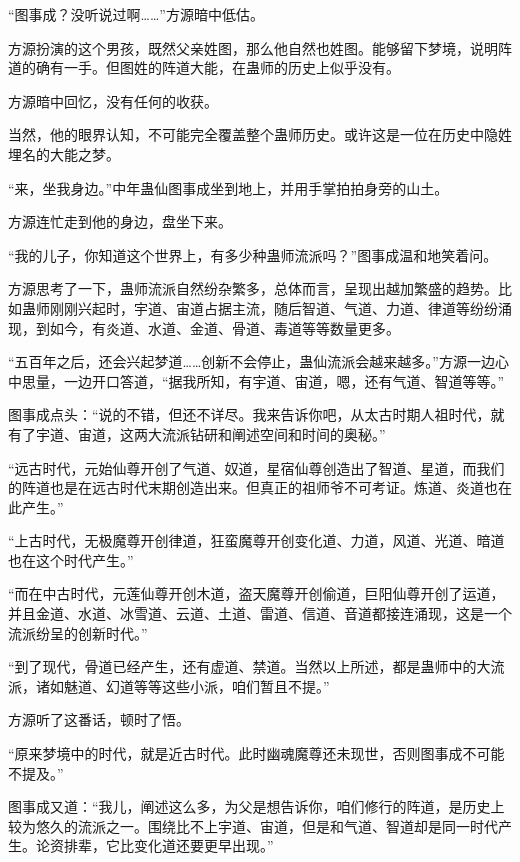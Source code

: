 
\begin{this_body}

“图事成？没听说过啊……”方源暗中低估。

方源扮演的这个男孩，既然父亲姓图，那么他自然也姓图。能够留下梦境，说明阵道的确有一手。但图姓的阵道大能，在蛊师的历史上似乎没有。

方源暗中回忆，没有任何的收获。

当然，他的眼界认知，不可能完全覆盖整个蛊师历史。或许这是一位在历史中隐姓埋名的大能之梦。

“来，坐我身边。”中年蛊仙图事成坐到地上，并用手掌拍拍身旁的山土。

方源连忙走到他的身边，盘坐下来。

“我的儿子，你知道这个世界上，有多少种蛊师流派吗？”图事成温和地笑着问。

方源思考了一下，蛊师流派自然纷杂繁多，总体而言，呈现出越加繁盛的趋势。比如蛊师刚刚兴起时，宇道、宙道占据主流，随后智道、气道、力道、律道等纷纷涌现，到如今，有炎道、水道、金道、骨道、毒道等等数量更多。

“五百年之后，还会兴起梦道……创新不会停止，蛊仙流派会越来越多。”方源一边心中思量，一边开口答道，“据我所知，有宇道、宙道，嗯，还有气道、智道等等。”

图事成点头：“说的不错，但还不详尽。我来告诉你吧，从太古时期人祖时代，就有了宇道、宙道，这两大流派钻研和阐述空间和时间的奥秘。”

“远古时代，元始仙尊开创了气道、奴道，星宿仙尊创造出了智道、星道，而我们的阵道也是在远古时代末期创造出来。但真正的祖师爷不可考证。炼道、炎道也在此产生。”

“上古时代，无极魔尊开创律道，狂蛮魔尊开创变化道、力道，风道、光道、暗道也在这个时代产生。”

“而在中古时代，元莲仙尊开创木道，盗天魔尊开创偷道，巨阳仙尊开创了运道，并且金道、水道、冰雪道、云道、土道、雷道、信道、音道都接连涌现，这是一个流派纷呈的创新时代。”

“到了现代，骨道已经产生，还有虚道、禁道。当然以上所述，都是蛊师中的大流派，诸如魅道、幻道等等这些小派，咱们暂且不提。”

方源听了这番话，顿时了悟。

“原来梦境中的时代，就是近古时代。此时幽魂魔尊还未现世，否则图事成不可能不提及。”

图事成又道：“我儿，阐述这么多，为父是想告诉你，咱们修行的阵道，是历史上较为悠久的流派之一。围绕比不上宇道、宙道，但是和气道、智道却是同一时代产生。论资排辈，它比变化道还要更早出现。”


\end{this_body}
